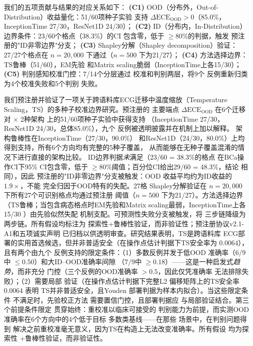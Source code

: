 
我们的五项贡献与结果的对应关系如下：
\textbf{(C1)} OOD（分布外，Out-of-Distribution）收益量化：51/60项种子实验
支持 $\Delta\text{ECE}_{\text{OOD}}>0$（85.0\%，InceptionTime
27/30，ResNet1D 24/30）；
\textbf{(C2)} ID（分布内，In-Distribution）边界条件：23/60个格点（38.3\%）的CI
包含零，低于 $\geq$80\%的判据，触发
预注册的"ID非零边界"分支；
\textbf{(C3)} Shapley分解（Shapley decomposition）验证：27/27个格点在
$n=20{,}000$ 下通过（$n=500$ 下为21/27）；
\textbf{(C4)} 方法选择边界：TS鲁棒（51/60），EM先验
和Matrix scaling脆弱（InceptionTime上各15/30）；
\textbf{(C5)} 判别感知校准门控：7/14个分层通过
校准和判别两层，将9个
反例重新归类为4个校准失败和5个判别
失败。

我们预注册并验证了一项关于跨语料库ECG迁移中温度缩放（Temperature Scaling，TS）的多种子校准边界研究。预注册的
主要端点 $\Delta\text{ECE}_{\text{OOD}}$ 在6个迁移对 $\times$ 2种架构
上的51/60项种子实验中获得支持
（InceptionTime 27/30，ResNet1D 24/30，总体85.0\%），九个
反例被透明披露并在机制上加以解释。
架构鲁棒性在InceptionTime（27/30，90.0\%）
和ResNet1D（24/30，80.0\%）上均得到支持，所有6个方向均有完整的5种子覆盖，
从而能够在无种子覆盖混淆的情况下进行直接的架构比较。
ID边界判据\emph{未}满足（23/60 = 38.3\%的格点
在BCa操作CI下95\% CI包含零，低于
$\geq$80\%阈值；百分位CI给出29/60 = 48.3\%，结论
相同），因此
预注册的"ID非零边界"分支被触发：OOD
收益平均约为ID收益的 $1.9\times$，不能
完全归因于OOD特有的失配。27格
Shapley分解验证在 $n=20{,}000$ 下所有27个可识别格点均通过预注册
阈值（$n=500$ 下为21/27）。方法选择边界
（TS鲁棒；当包含病态格点时EM先验和Matrix scaling最弱，InceptionTime上各15/30
）由先验似然失配
机制支配。可预测性失败分支被触发，将
三步链降级为两步链。所有假设均标注为
探索性+鲁棒性验证，而非验证性；预注册协议v2.1-A1和五项诚实声明
已归档以供透明审查。研究结果表明，TS是跨语料库
ECG部署的实用首选候选，但并非普适安全（在操作点估计判据下TS安全率为 $0.0064$），且有两个由九个
反例支持的限定条件：（1）多数反例并发于低OOD
准确率（6/9中 $\leq 0.50$）和大ID--OOD准确率间隙
（7/9中 $\geq 0.18$）——这是一种启发式\emph{趋势}，而非充分
门控（三个反例的OOD准确率 $>0.5$，因此仅凭准确率
无法排除失败）；（2）需要局部
验证（在操作点估计判据下完整L2
偏移矩阵上的TS安全率 $0.0064$ 表明
TS并非普适安全，且Youden
部署判据为样本内拟合）。当这些限定条件
不满足时，先验校正方法
需要置信门控，且部署判据应
与局部验证结合。第三个前提条件限定
贯穿始终：重校准以临床可接受的
判别能力为前提，而实测OOD准确率在6个方向中的4个低于目标
多数类基线——在那些
场景中，在判别问题得到
解决之前重校准毫无意义，因为TS在构造上无法改变准确率。所有假设
均为探索性
+鲁棒性验证，而非验证性。


